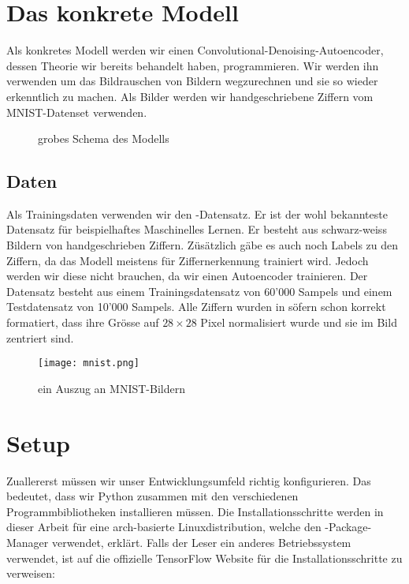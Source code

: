 \section{Das konkrete Modell}
Als konkretes Modell werden wir einen Convolutional-Denoising-Autoencoder,
dessen Theorie wir bereits behandelt haben, programmieren.
Wir werden ihn verwenden um das Bildrauschen von Bildern wegzurechnen und sie so
wieder erkenntlich zu machen. Als
Bilder werden wir handgeschriebene Ziffern vom MNIST-Datenset verwenden.

\begin{figure}
  \caption{grobes Schema des Modells}
\end{figure}

\para{}
\subsection{Daten}
Als Trainingsdaten verwenden wir den -Datensatz. Er ist der wohl
bekannteste Datensatz für beispielhaftes Maschinelles Lernen.
Er besteht aus schwarz-weiss Bildern von handgeschrieben Ziffern.
Züsätzlich gäbe es auch noch Labels zu den Ziffern, da das Modell meistens
für Ziffernerkennung trainiert wird. Jedoch werden
wir diese nicht brauchen, da wir einen Autoencoder trainieren.
\para{}
Der Datensatz besteht aus einem Trainingsdatensatz von 60'000 Sampels und einem Testdatensatz
von 10'000 Sampels. Alle Ziffern wurden in söfern schon korrekt formatiert,
dass ihre Grösse auf $28 \times 28$ Pixel normalisiert wurde und sie im Bild
zentriert sind.

\begin{figure}
  \centering
  \texttt{[image: mnist.png]}
  \caption{ein Auszug an MNIST-Bildern \cite{res:mnist_images}}
\end{figure}

\para{}
\cite{net:mnist}

\section{Setup}
Zuallererst müssen wir unser Entwicklungsumfeld richtig konfigurieren. Das
bedeutet, dass wir Python zusammen mit den verschiedenen Programmbibliotheken
installieren müssen.
\para{}
Die Installationsschritte werden in dieser Arbeit für eine arch-basierte
Linuxdistribution, welche den -Package-Manager verwendet, erklärt.
\para{}
Falls der Leser ein anderes Betriebssystem verwendet, ist auf die offizielle
TensorFlow Website für die Installationsschritte zu verweisen:
\para{}

